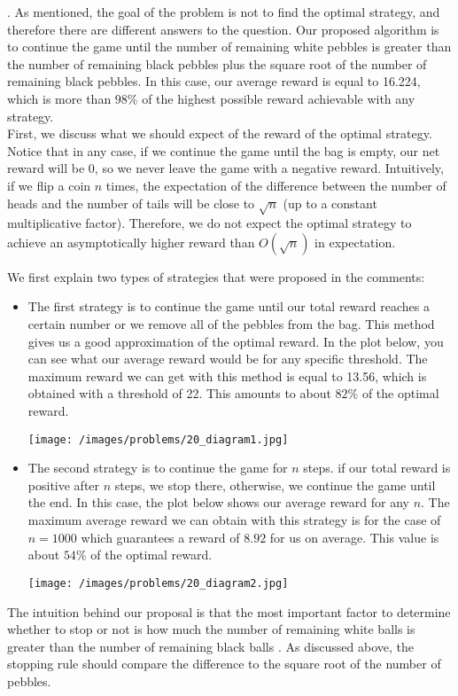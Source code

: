 \begin{solution}.
As mentioned, the goal of the problem is not to find the optimal strategy, and therefore there are different answers to the question. Our proposed algorithm is to continue the game until the number of remaining white pebbles is greater than the number of remaining black pebbles plus the square root of the number of remaining black pebbles. In this case, our average reward is equal to 16.224, which is more than $98\%$ of the highest possible reward achievable with any strategy.\\[0.2cm]

First, we discuss what we should expect of the reward of the optimal strategy. Notice that in any case, if we continue the game until the bag is empty, our net reward will be 0, so we never leave the game with a negative reward. Intuitively, if we flip a coin $n$ times, the expectation of the difference between the number of heads and the number of tails will be close to $\sqrt{n}$ (up to a constant multiplicative factor). Therefore, we do not expect the optimal strategy to  achieve an asymptotically higher reward than $O(\sqrt{n})$ in expectation. 


We first explain two types of strategies that were proposed in the comments:

\begin{itemize}
\item The first strategy is to continue the game until our total reward reaches a certain number or we remove all of the pebbles from the bag. This method gives us a good approximation of the optimal reward. In the plot below, you can see what our average reward would be for any specific threshold. The maximum reward we can get with this method is equal to 13.56, which is obtained with a threshold of 22. This amounts to about $82\%$ of the optimal reward.

\begin{center}
	\texttt{[image: /images/problems/20\_diagram1.jpg]}
\end{center}

\item The second strategy is to continue the game for $n$ steps. if our total reward is positive after $n$ steps, we stop there, otherwise, we continue the game until the end. In this case, the plot below shows our average reward for any $n$. The maximum average reward we can obtain with this strategy is for the case of $n=1000$ which guarantees a reward of $8.92$ for us on average. This value is about $54\%$ of the optimal reward.

\begin{center}
	\texttt{[image: /images/problems/20\_diagram2.jpg]}
\end{center}
\end{itemize}


The intuition behind our proposal is that the most important factor to determine whether to stop or not is how much the number of remaining white balls  is greater than the number of remaining black balls . As discussed above, the stopping rule should compare the difference to the square root of the number of pebbles.

\end{solution}